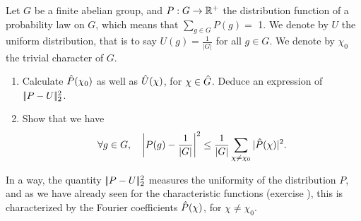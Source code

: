 \begin{exo}
\label{exo-repartition-proba}

 Let $G$ be a finite abelian group, and $ P: G \rightarrow \mathbb{R}^+ $ the distribution function of a probability law on $G$, which means that $\sum_{g \in G}{P(g)} = $ 1. We denote by $ U $ the uniform distribution, that is to say $ U(g) = \frac{1}{|G|}$ for all $ g \in G$. We denote by $\chi_0 $ the trivial character of $G$. \begin{enumerate}
\item Calculate $\hat{P}(\chi_0)$ as well as $\hat{U}(\chi)$, for $\chi \in \hat{G}$. Deduce an expression of $|\!| P - U |\!|_2^2 $.
\item Show that we have
\begin{equation*}
\forall g \in G, \quad \left| P(g) - \frac{1}{|G|} \right|^2 \leq \frac{1}{|G|} \sum_{\chi \neq \chi_0}{|\hat{P} ( \chi) |^2}.
\end{equation*}

\end{enumerate} In a way, the quantity $|\!| P - U |\!|_2^2 $ measures the uniformity of the distribution $ P $, and as we have already seen for the characteristic functions (exercise ), this is characterized by the Fourier coefficients $\hat{P}(\chi)$, for $\chi \neq \chi_0 $.
\end{exo}


